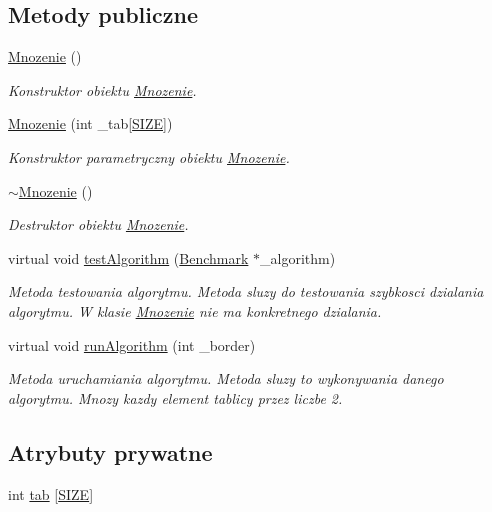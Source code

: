 \subsection*{Metody publiczne}
\begin{DoxyCompactItemize}
\item 
\hyperlink{class_mnozenie_aac38391baa7ffd14970526902ab750de}{Mnozenie} ()
\begin{DoxyCompactList}\small\item\em Konstruktor obiektu \hyperlink{class_mnozenie}{Mnozenie}. \end{DoxyCompactList}\item 
\hyperlink{class_mnozenie_a5252eb846883e6813fc2fef82a30c751}{Mnozenie} (int \-\_\-tab\mbox{[}\hyperlink{benchmark_8hh_a70ed59adcb4159ac551058053e649640}{S\-I\-Z\-E}\mbox{]})
\begin{DoxyCompactList}\small\item\em Konstruktor parametryczny obiektu \hyperlink{class_mnozenie}{Mnozenie}. \end{DoxyCompactList}\item 
\hyperlink{class_mnozenie_ad57f03bc66770fb6a442169781ee2156}{$\sim$\-Mnozenie} ()
\begin{DoxyCompactList}\small\item\em Destruktor obiektu \hyperlink{class_mnozenie}{Mnozenie}. \end{DoxyCompactList}\item 
virtual void \hyperlink{class_mnozenie_a039792aaa5ce9723cd61d29869cf0101}{test\-Algorithm} (\hyperlink{class_benchmark}{Benchmark} $\ast$\-\_\-algorithm)
\begin{DoxyCompactList}\small\item\em Metoda testowania algorytmu. Metoda sluzy do testowania szybkosci dzialania algorytmu. W klasie \hyperlink{class_mnozenie}{Mnozenie} nie ma konkretnego dzialania. \end{DoxyCompactList}\item 
virtual void \hyperlink{class_mnozenie_a46b1c55b7ba208fa137065147e107be9}{run\-Algorithm} (int \-\_\-border)
\begin{DoxyCompactList}\small\item\em Metoda uruchamiania algorytmu. Metoda sluzy to wykonywania danego algorytmu. Mnozy kazdy element tablicy przez liczbe 2. \end{DoxyCompactList}\end{DoxyCompactItemize}
\subsection*{Atrybuty prywatne}
\begin{DoxyCompactItemize}
\item 
int \hyperlink{class_mnozenie_a6dc67671f84a557d97c322b8af528359}{tab} \mbox{[}\hyperlink{benchmark_8hh_a70ed59adcb4159ac551058053e649640}{S\-I\-Z\-E}\mbox{]}
\end{DoxyCompactItemize}


